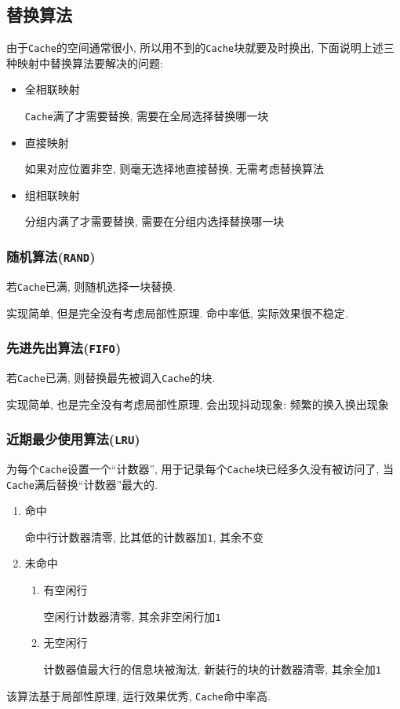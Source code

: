 \subsection{替换算法}
由于\verb|Cache|的空间通常很小, 所以用不到的\verb|Cache|块就要及时换出, 下面说明上述三种映射中替换算法要解决的问题:
\begin{itemize}
\item 全相联映射 \par \verb|Cache|满了才需要替换, 需要在全局选择替换哪一块
\item 直接映射 \par 如果对应位置非空, 则毫无选择地直接替换, 无需考虑替换算法
\item 组相联映射 \par 分组内满了才需要替换, 需要在分组内选择替换哪一块
\end{itemize}
\subsubsection{随机算法(\texttt{RAND})}
若\verb|Cache|已满, 则随机选择一块替换. \par
实现简单, 但是完全没有考虑局部性原理. 命中率低, 实际效果很不稳定.
\subsubsection{先进先出算法(\texttt{FIFO})}
若\verb|Cache|已满, 则替换最先被调入\verb|Cache|的块. \par
实现简单, 也是完全没有考虑局部性原理, 会出现抖动现象: 频繁的换入换出现象
\subsubsection{近期最少使用算法(\texttt{LRU})}
为每个\verb|Cache|设置一个``计数器'', 用于记录每个\verb|Cache|块已经多久没有被访问了, 当\verb|Cache|满后替换``计数器''最大的. \par
\begin{enumerate}
\item 命中 \par 命中行计数器清零, 比其低的计数器加\verb|1|, 其余不变
\item 未命中
\begin{enumerate}
\item 有空闲行 \par 空闲行计数器清零, 其余非空闲行加\verb|1|
\item 无空闲行 \par 计数器值最大行的信息块被淘汰, 新装行的块的计数器清零, 其余全加\verb|1|
\end{enumerate}
\end{enumerate}\par
该算法基于局部性原理, 运行效果优秀, \verb|Cache|命中率高.
